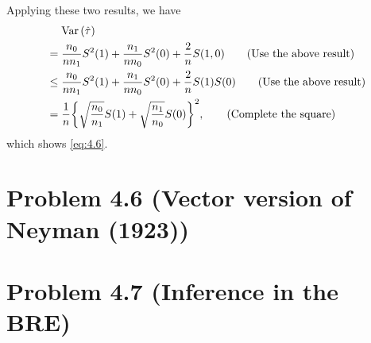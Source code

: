 \documentclass[10pt]{article}
\begin{document}
Applying these two results,
we have
\begin{align*}
  &\mathrel{\phantom{=}} \operatorname{Var}{\left( \hat{\tau} \right)} \\
  &= \frac{n_0}{n n_1} S^2(1) + \frac{n_1}{n n_0} S^2(0) + \frac{2}{n} S(1, 0) \tag{Use the above result} \\
  &\leq \frac{n_0}{n n_1} S^2(1) + \frac{n_1}{n n_0} S^2(0) + \frac{2}{n} S(1) S(0) \tag{Use the above result} \\
  &= \frac{1}{n} {\left\lbrace \sqrt{\frac{n_0}{n_1}} S(1) + \sqrt{\frac{n_1}{n_0}} S(0) \right\rbrace}^2, \tag{Complete the square}
\end{align*}
which shows \cref{eq:4.6}.

\section*{Problem 4.6 (Vector version of Neyman (1923))}

\section*{Problem 4.7 (Inference in the BRE)}

\printglossaries
\end{document}
